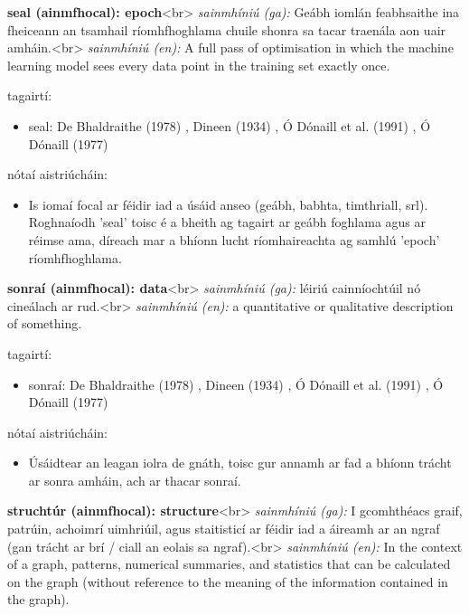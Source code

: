 \documentclass{article}
\begin{document}
\textbf{seal (ainmfhocal): epoch}<br>
\textit{sainmhíniú (ga):}  Geábh iomlán feabhsaithe ina fheiceann an tsamhail ríomhfhoghlama chuile shonra sa tacar traenála aon uair amháin.<br>
\textit{sainmhíniú (en):} A full pass of optimisation in which the machine learning model sees every data point in the training set exactly once.

tagairtí:
\begin{itemize}
	\item seal: De Bhaldraithe (1978) \cite{de-bhaldraithe}, Dineen (1934) \cite{dineen}, Ó Dónaill et al. (1991) \cite{focloir-beag}, Ó Dónaill (1977) \cite{odonaill}
\end{itemize}

nótaí aistriúcháin:
\begin{itemize}
	\item Is iomaí focal ar féidir iad a úsáid anseo (geábh, babhta, timthriall, srl). Roghnaíodh 'seal' toisc é a bheith ag tagairt ar geábh foghlama agus ar réimse ama, díreach mar a bhíonn lucht ríomhaireachta ag samhlú 'epoch' ríomhfhoghlama.
\end{itemize}


\textbf{sonraí (ainmfhocal): data}<br>
\textit{sainmhíniú (ga):} léiriú cainníochtúil nó cineálach ar rud.<br>
\textit{sainmhíniú (en):} a quantitative or qualitative description of something.

tagairtí:
\begin{itemize}
	\item sonraí: De Bhaldraithe (1978) \cite{de-bhaldraithe}, Dineen (1934) \cite{dineen}, Ó Dónaill et al. (1991) \cite{focloir-beag}, Ó Dónaill (1977) \cite{odonaill}
\end{itemize}

nótaí aistriúcháin:
\begin{itemize}
	\item Úsáidtear an leagan iolra de gnáth, toisc gur annamh ar fad a bhíonn trácht ar sonra amháin, ach ar thacar sonraí.
\end{itemize}


\textbf{struchtúr (ainmfhocal): structure}<br>
\textit{sainmhíniú (ga):} I gcomhthéacs graif, patrúin, achoimrí uimhriúil, agus staitisticí ar féidir iad a áireamh ar an ngraf (gan trácht ar brí / ciall an eolais sa ngraf).<br>
\textit{sainmhíniú (en):} In the context of a graph, patterns, numerical summaries, and statistics that can be calculated on the graph (without reference to the meaning of the information contained in the graph).
\end{document}
